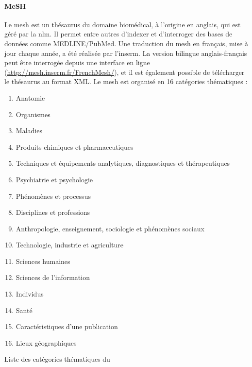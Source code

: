 \paragraph{MeSH}
Le \gls{mesh} \cite{lipscombMedicalSubjectHeadings2000} est un thésaurus du domaine biomédical, à l'origine en anglais, qui est géré par la \gls{nlm}.
Il permet entre autres d'indexer et d'interroger des bases de données comme MEDLINE/PubMed.
Une traduction du \gls{mesh} en français, mise à jour chaque année, a été réalisée par l'\gls{inserm}.
La version bilingue anglais-français peut être interrogée depuis une interface en ligne (\url{http://mesh.inserm.fr/FrenchMesh/}), et il est également possible de télécharger le thésaurus au format XML.
Le \gls{mesh} est organisé en \num{16} catégories thématiques :

\begin{table}[H]
    \begin{multicols}{2}
        \begin{enumerate}[label=\textbf{\Alph*}]
            \item \label{mesh:A} Anatomie
            \item \label{mesh:B} Organismes
            \item \label{mesh:C} Maladies
            \item \label{mesh:D} Produits chimiques et pharmaceutiques
            \item \label{mesh:E} Techniques et équipements analytiques, diagnostiques et thérapeutiques
            \item \label{mesh:F} Psychiatrie et psychologie
            \item \label{mesh:G} Phénomènes et processus
            \item \label{mesh:H} Disciplines et professions
            \item \label{mesh:I} Anthropologie, enseignement, sociologie et phénomènes sociaux
            \item \label{mesh:J} Technologie, industrie et agriculture
            \item \label{mesh:K} Sciences humaines
            \item \label{mesh:L} Sciences de l'information
            \item \label{mesh:M} Individus
            \item \label{mesh:N} Santé
                  \setcounter{enumi}{21}
            \item \label{mesh:V} Caractéristiques d'une publication
                  \setcounter{enumi}{25}
            \item \label{mesh:Z} Lieux géographiques
        \end{enumerate}
    \end{multicols}
    \caption{Liste des catégories thématiques du }
\end{table}

